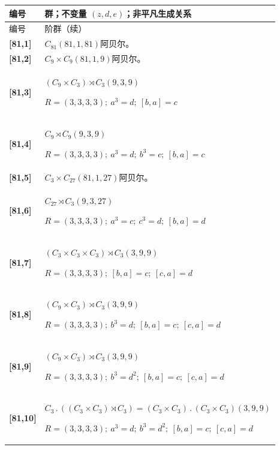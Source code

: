 \documentclass[UTF8,fontset=fandol,11pt,a4paper]{ctexart}
\begin{document}
\begin{longtable}{@{}p{17mm}>{\raggedright\arraybackslash}p{141mm}@{}}

\toprule 编号 & 群；不变量 $(z,d,e)$；非平凡生成关系\\\midrule\endfirsthead

\toprule 编号 & 81 阶群（续）\\\midrule\endhead\bottomrule\endfoot

\textbf{[81,1]} & $C_{81}$\quad $(81,1,81)$\quad 阿贝尔。\\[3pt]

\textbf{[81,2]} & $C_{9}\times C_{9}$\quad $(81,1,9)$\quad 阿贝尔。\\[3pt]

\textbf{[81,3]} & $(C_{9}\times C_{3})\rtimes C_{3}$\quad $(9,3,9)$\par\(R=(3,3,3,3);\allowbreak\ a^{3}=d;\allowbreak\ [b,a]=c\)\\[3pt]

\textbf{[81,4]} & $C_{9}\rtimes C_{9}$\quad $(9,3,9)$\par\(R=(3,3,3,3);\allowbreak\ a^{3}=d;\allowbreak\ b^{3}=c;\allowbreak\ [b,a]=c\)\\[3pt]

\textbf{[81,5]} & $C_{3}\times C_{27}$\quad $(81,1,27)$\quad 阿贝尔。\\[3pt]

\textbf{[81,6]} & $C_{27}\rtimes C_{3}$\quad $(9,3,27)$\par\(R=(3,3,3,3);\allowbreak\ a^{3}=c;\allowbreak\ c^{3}=d;\allowbreak\ [b,a]=d\)\\[3pt]

\textbf{[81,7]} & $(C_{3}\times C_{3}\times C_{3})\rtimes C_{3}$\quad $(3,9,9)$\par\(R=(3,3,3,3);\allowbreak\ [b,a]=c;\allowbreak\ [c,a]=d\)\\[3pt]

\textbf{[81,8]} & $(C_{9}\times C_{3})\rtimes C_{3}$\quad $(3,9,9)$\par\(R=(3,3,3,3);\allowbreak\ b^{3}=d;\allowbreak\ [b,a]=c;\allowbreak\ [c,a]=d\)\\[3pt]

\textbf{[81,9]} & $(C_{9}\times C_{3})\rtimes C_{3}$\quad $(3,9,9)$\par\(R=(3,3,3,3);\allowbreak\ b^{3}=d^{2};\allowbreak\ [b,a]=c;\allowbreak\ [c,a]=d\)\\[3pt]

\textbf{[81,10]} & $C_{3}\mathbin{.} ((C_{3}\times C_{3})\rtimes C_{3}) = (C_{3}\times C_{3})\mathbin{.} (C_{3}\times C_{3})$\quad $(3,9,9)$\par\(R=(3,3,3,3);\allowbreak\ a^{3}=d;\allowbreak\ b^{3}=d^{2};\allowbreak\ [b,a]=c;\allowbreak\ [c,a]=d\)\\[3pt]


\end{longtable}
\end{document}
